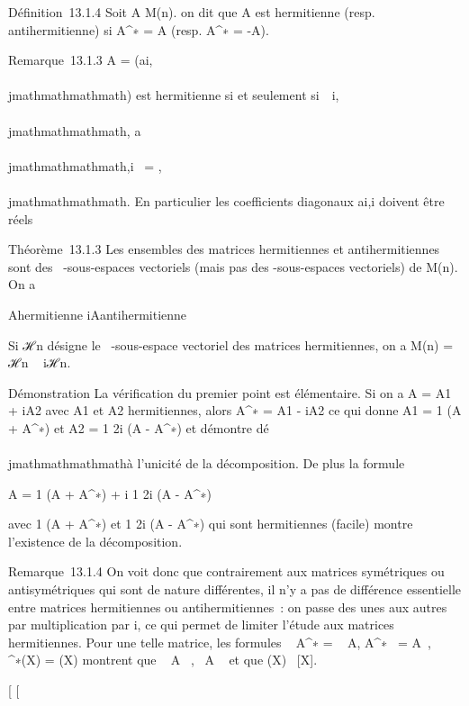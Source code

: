 Définition~13.1.4 Soit A \in M(n). on dit que A est hermitienne
(resp. antihermitienne) si A^∗ = A (resp. A^∗ =
-A).

Remarque~13.1.3 A = (ai,\\\\jmathmathmathmath) est hermitienne si et seulement
si~\forall~i,\\\\jmathmathmathmath, a\\\\jmathmathmathmath,i~ =
\overlineai,\\\\jmathmathmathmath. En particulier les
coefficients diagonaux ai,i doivent être réels

Théorème~13.1.3 Les ensembles des matrices hermitiennes et
antihermitiennes sont des ~-sous-espaces vectoriels (mais pas des
-sous-espaces vectoriels) de M(n). On a

A\text hermitienne  \Leftrightarrow
iA\text antihermitienne

Si ℋn désigne le ~-sous-espace vectoriel des matrices
hermitiennes, on a M(n) = ℋn \oplus~ iℋn.

Démonstration La vérification du premier point est élémentaire. Si on a
A = A1 + iA2 avec A1 et A2
hermitiennes, alors A^∗ = A1 - iA2 ce qui
donne A1 = 1  (A + A^∗)
et A2 = 1 \over 2i (A - A^∗) et
démontre dé\\\\jmathmathmathmathà l'unicité de la décomposition. De plus la formule

A = 1  (A + A^∗) + i 1
\over 2i (A - A^∗)

avec  1  (A + A^∗) et  1
\over 2i (A - A^∗) qui sont hermitiennes
(facile) montre l'existence de la décomposition.

Remarque~13.1.4 On voit donc que contrairement aux matrices symétriques
ou antisymétriques qui sont de nature différentes, il n'y a pas de
différence essentielle entre matrices hermitiennes ou antihermitiennes~:
on passe des unes aux autres par multiplication par i, ce qui permet de
limiter l'étude aux matrices hermitiennes. Pour une telle matrice, les
formules ~
A^∗ =
\overline{}~
A,
A^∗~ =
\overline{}A~,
\chiA^∗(X) =
\overline\chiA(X) montrent que
~ A \in {}~,
~A \in {}~ et que
\chiA(X) \in {}~{[}X{]}.

{[}
{[}
